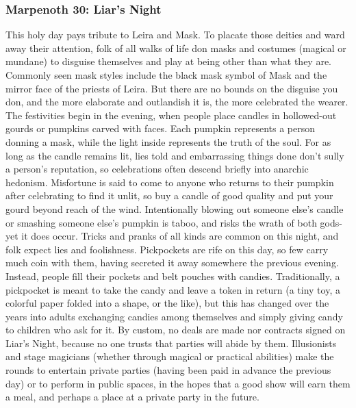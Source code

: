 \documentclass[10pt,a4paper,twoside,twocolumn,openany,nodeprecatedcode]{dndbook}
\begin{document}
\subsubsection{Marpenoth 30: Liar's Night}
This holy day pays tribute to Leira and Mask. To placate those deities and ward away their attention, folk of all walks of life don masks and costumes (magical or mundane) to disguise themselves and play at being other than what they are. Commonly seen mask styles include the black mask symbol of Mask and the mirror face of the priests of Leira. But there are no bounds on the disguise you don, and the more elaborate and outlandish it is, the more celebrated the wearer.
The festivities begin in the evening, when people place candles in hollowed-out gourds or pumpkins carved with faces. Each pumpkin represents a person donning a mask, while the light inside represents the truth of the soul. For as long as the candle remains lit, lies told and embarrassing things done don't sully a person's reputation, so celebrations often descend briefly into anarchic hedonism.
Misfortune is said to come to anyone who returns to their pumpkin after celebrating to find it unlit, so buy a candle of good quality and put your gourd beyond reach of the wind. Intentionally blowing out someone else's candle or smashing someone else's pumpkin is taboo, and risks the wrath of both gods-yet it does occur.
Tricks and pranks of all kinds are common on this night, and folk expect lies and foolishness. Pickpockets are rife on this day, so few carry much coin with them, having secreted it away somewhere the previous evening. Instead, people fill their pockets and belt pouches with candies. Traditionally, a pickpocket is meant to take the candy and leave a token in return (a tiny toy, a colorful paper folded into a shape, or the like), but this has changed over the years into adults exchanging candies among themselves and simply giving candy to children who ask for it.
By custom, no deals are made nor contracts signed on Liar's Night, because no one trusts that parties will abide by them. Illusionists and stage magicians (whether through magical or practical abilities) make the rounds to entertain private parties (having been paid in advance the previous day) or to perform in public spaces, in the hopes that a good show will earn them a meal, and perhaps a place at a private party in the future.
\end{document}
